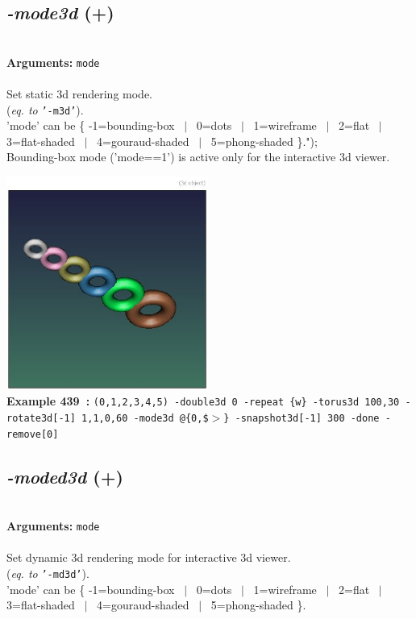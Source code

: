 \documentclass[a4paper,11pt,twoside]{book}
\begin{document}
\subsection{\emph{-mode3d} (+)}\vspace*{-0.5em}
~\\\textbf{Arguments: } 
{\small \texttt{mode}}\\~\\
Set static 3d rendering mode.
~\\(\emph{eq. to} {\small \texttt{'-m3d'}}).
~\\'mode' can be \{ -1=bounding-box ~$|$~ 0=dots ~$|$~ 1=wireframe ~$|$~ 2=flat ~$|$~ 3=flat-shaded ~$|$~ 4=gouraud-shaded ~$|$~ 5=phong-shaded \}.");
~\\Bounding-box mode ('mode==1') is active only for the interactive 3d viewer.
\begin{center}\includegraphics[keepaspectratio=true,height=7cm,width=\textwidth]{img/gmic_def439.jpg}\\
{\footnotesize \textbf{Example 439~:} \texttt{(0,1,2,3,4,5) -double3d 0 -repeat \{w\} -torus3d 100,30 -rotate3d[-1] 1,1,0,60 -mode3d @\{0,\$$>$\} -snapshot3d[-1] 300 -done -remove[0]}}
\end{center}

\subsection{\emph{-moded3d} (+)}\vspace*{-0.5em}
~\\\textbf{Arguments: } 
{\small \texttt{mode}}\\~\\
Set dynamic 3d rendering mode for interactive 3d viewer.
~\\(\emph{eq. to} {\small \texttt{'-md3d'}}).
~\\'mode' can be \{ -1=bounding-box ~$|$~ 0=dots ~$|$~ 1=wireframe ~$|$~ 2=flat ~$|$~ 3=flat-shaded ~$|$~ 4=gouraud-shaded ~$|$~ 5=phong-shaded \}.
\end{document}
